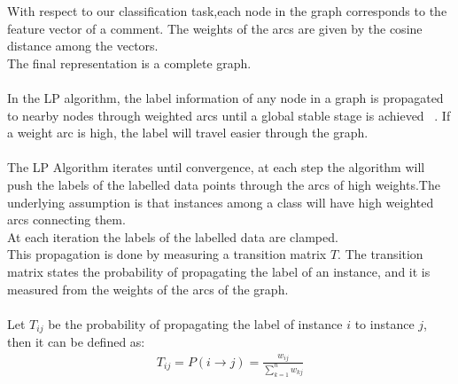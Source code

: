 \documentclass[4pt,a4paper,twocolumn]{article}
\begin{document}
With respect to our classification task,each node in the graph corresponds to the feature vector of a comment.
The weights of the arcs are given by the cosine distance among the vectors.\\
The final representation is a complete graph.\\
\\
In the LP algorithm, the label information of any
node in a graph is propagated to nearby nodes
through weighted arcs until a global stable stage is
achieved ~\cite{Chen:2006:REU:1220175.1220192}.
If a weight arc is high, the label will travel easier through the graph.\\
\\
The LP Algorithm iterates until convergence,
at each step the algorithm will push the labels
of the labelled data points through the arcs of high weights.The underlying assumption is that instances among a class will have high weighted arcs
connecting them.\\
At each iteration the labels of the labelled data are clamped.\\

This propagation is done by measuring a transition matrix $T$.
The transition matrix states the probability of propagating the label of an instance,
and it is measured from the weights of the arcs of the graph.\\
\\
Let $T_{ij}$ be the probability of propagating the label of instance $i$ to instance $j$, then it can be defined as:\\
\begin{align}
	T_{ij}=P(i \rightarrow j)=\frac{w_{ij}}{\sum_{k=1}^{n} w_{kj}}
\end{align}
\end{document}
